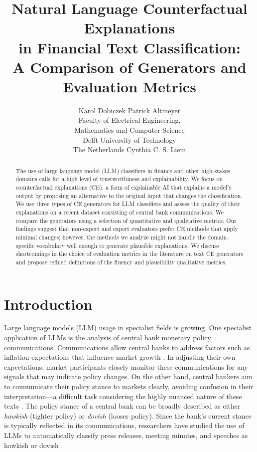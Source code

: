 \documentclass[11pt]{article}
\title{Natural Language Counterfactual Explanations \\in Financial Text Classification: \\A Comparison of Generators and Evaluation Metrics}
\author{Karol Dobiczek \And Patrick Altmeyer \\
        Faculty of Electrical Engineering, \\ Mathematics and Computer Science \\
Delft University of Technology \\ The Netherlands \And Cynthia C. S. Liem }
\begin{document}
\maketitle
\begin{abstract}
The use of large language model (LLM) classifiers in finance and other high-stakes domains calls for a high level of trustworthiness and explainability. We focus on counterfactual explanations (CE), a form of explainable AI that explains a model's output by proposing an alternative to the original input that changes the classification. We use three types of CE generators for LLM classifiers and assess the quality of their explanations on a recent dataset consisting of central bank communications. We compare the generators using a selection of quantitative and qualitative metrics. Our findings suggest that non-expert and expert evaluators prefer CE methods that apply minimal changes; however, the methods we analyze might not handle the domain-specific vocabulary well enough to generate plausible explanations. We discuss shortcomings in the choice of evaluation metrics in the literature on text CE generators and propose refined definitions of the fluency and plausibility qualitative metrics. 
\end{abstract}

\section{Introduction}

Large language models (LLM) usage in specialist fields is growing. One specialist application of LLMs is the analysis of central bank monetary policy communications. Communications allow central banks to address factors such as inflation expectations that influence market growth \cite{rozkrut_quest_2007}. In adjusting their own expectations, market participants closely monitor these communications for any signals that may indicate policy changes. On the other hand, central bankers aim to communicate their policy stance to markets clearly, avoiding confusion in their interpretation---a difficult task considering the highly nuanced nature of these texts \cite{cieslak_non-monetary_2019}. The policy stance of a central bank can be broadly described as either \textit{hawkish} (tighter policy) or \textit{dovish} (looser policy). Since the bank's current stance is typically reflected in its communications, researchers have studied the use of LLMs to automatically classify press releases, meeting minutes, and speeches as hawkish or dovish \cite{wang_aspect-based_2023}. %
\end{document}
